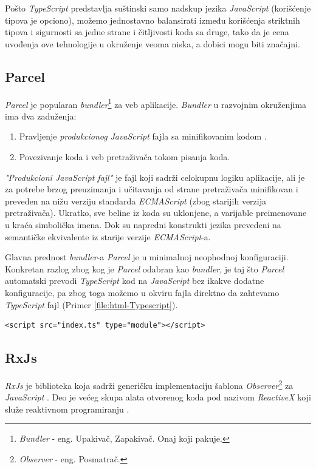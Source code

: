 \documentclass[12pt,oneside]{memoir}
\newcommand{\code}[1]{\allowbreak{\colorbox{codegray}{\texttt{\scalebox{0.9}{#1}}}}}%
\begin{document}
Pošto \emph{TypeScript} predstavlja suštinski samo nadskup jezika \emph{JavaScript} (korišćenje tipova je opciono),
možemo jednostavno balansirati između korišćenja striktnih tipova i sigurnosti sa jedne strane i čitljivosti koda sa druge,
tako da je cena uvođenja ove tehnologije u okruženje veoma niska, a dobici mogu biti značajni.
\subsection{Parcel}
\emph{Parcel} je popularan \emph{bundler}\footnote{\emph{Bundler} - eng. Upakivač, Zapakivač. Onaj koji pakuje.} za veb aplikacije.
\emph{Bundler} u razvojnim okruženjima ima dva zaduženja:
\begin{enumerate}
  \item Pravljenje \emph{produkcionog} \emph{JavaScript} fajla sa minifikovanim kodom \cite{Minification}.
  \item Povezivanje koda i veb pretraživača tokom pisanja koda.
\end{enumerate} 
\emph{"Produkcioni JavaScript fajl"} je fajl koji sadrži celokupnu logiku aplikacije, ali je za potrebe brzog preuzimanja i
učitavanja od strane pretraživača minifikovan i preveden na nižu verziju standarda \emph{ECMAScript} \cite{ECMAScript}(zbog starijih verzija pretraživača).
Ukratko, sve beline iz koda su uklonjene, a varijable preimenovane u kraća simbolička imena. Dok su napredni konstrukti jezika
prevedeni na semantičke ekvivalente iz starije verzije \emph{ECMAScript}-a.

Glavna prednost \emph{bundler}-a \emph{Parcel} je u minimalnoj neophodnoj konfiguraciji.
Konkretan razlog zbog kog je \emph{Parcel} odabran kao \emph{bundler}, je taj što \emph{Parcel} automatski
prevodi \emph{TypeScript} kod na \emph{JavaScript} bez ikakve dodatne konfiguracije, pa zbog toga možemo u okviru
fajla \code{index.html} direktno da zahtevamo \emph{TypeScript} fajl (Primer \ref{file:html-Typescript}).
\begin{lstlisting}[style=htmlStyle,numberstyle=\tiny, caption={Uključivanje \emph{TypeScript} fajla direktno u \code{index.html}}, label=file:html-Typescript]
<script src="index.ts" type="module"></script>
\end{lstlisting}

\subsection{RxJs}
\emph{RxJs} je biblioteka koja sadrži generičku implementaciju šablona \emph{Observer}\footnote{\emph{Observer} - eng. Posmatrač.} za \emph{JavaScript} \cite{GoF} \cite{RxJs}.
Deo je većeg skupa alata otvorenog koda pod nazivom \emph{ReactiveX} koji služe reaktivnom programiranju \cite{ReactiveX}.
\end{document}
